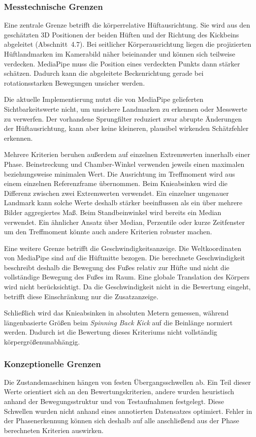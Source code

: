 \documentclass[intern]{cgMA}
\begin{document}
\subsubsection{Messtechnische Grenzen}
Eine zentrale Grenze betrifft die körperrelative Hüftausrichtung. Sie wird aus den geschätzten 3D Positionen der beiden Hüften und der Richtung des Kickbeins abgeleitet (Abschnitt~4.7). Bei seitlicher Körperausrichtung liegen die projizierten Hüftlandmarken im Kamerabild näher beieinander und können sich teilweise verdecken. MediaPipe muss die Position eines verdeckten Punkts dann stärker schätzen. Dadurch kann die abgeleitete Beckenrichtung gerade bei rotationsstarken Bewegungen unsicher werden.

Die aktuelle Implementierung nutzt die von MediaPipe gelieferten Sichtbarkeitswerte nicht, um unsichere Landmarken zu erkennen oder Messwerte zu verwerfen. Der vorhandene Sprungfilter reduziert zwar abrupte Änderungen der Hüftausrichtung, kann aber keine kleineren, plausibel wirkenden Schätzfehler erkennen.

Mehrere Kriterien beruhen außerdem auf einzelnen Extremwerten innerhalb einer Phase. Beinstreckung und Chamber-Winkel verwenden jeweils einen maximalen beziehungsweise minimalen Wert. Die Ausrichtung im Treffmoment wird aus einem einzelnen Referenzframe übernommen. Beim Knieabsinken wird die Differenz zwischen zwei Extremwerten verwendet. Ein einzelner ungenauer Landmark kann solche Werte deshalb stärker beeinflussen als ein über mehrere Bilder aggregiertes Maß. Beim Standbeinwinkel wird bereits ein Median verwendet. Ein ähnlicher Ansatz über Median, Perzentile oder kurze Zeitfenster um den Treffmoment könnte auch andere Kriterien robuster machen.

Eine weitere Grenze betrifft die Geschwindigkeitsanzeige. Die Weltkoordinaten von MediaPipe sind auf die Hüftmitte bezogen. Die berechnete Geschwindigkeit beschreibt deshalb die Bewegung des Fußes relativ zur Hüfte und nicht die vollständige Bewegung des Fußes im Raum. Eine globale Translation des Körpers wird nicht berücksichtigt. Da die Geschwindigkeit nicht in die Bewertung eingeht, betrifft diese Einschränkung nur die Zusatzanzeige.

Schließlich wird das Knieabsinken in absoluten Metern gemessen, während längenbasierte Größen beim \textit{Spinning Back Kick} auf die Beinlänge normiert werden. Dadurch ist die Bewertung dieses Kriteriums nicht vollständig körpergrößenunabhängig.

\subsubsection{Konzeptionelle Grenzen}
Die Zustandsmaschinen hängen von festen Übergangsschwellen ab. Ein Teil dieser Werte orientiert sich an den Bewertungskriterien, andere wurden heuristisch anhand der Bewegungsstruktur und von Testaufnahmen festgelegt. Diese Schwellen wurden nicht anhand eines annotierten Datensatzes optimiert. Fehler in der Phasenerkennung können sich deshalb auf alle anschließend aus der Phase berechneten Kriterien auswirken.
\end{document}
